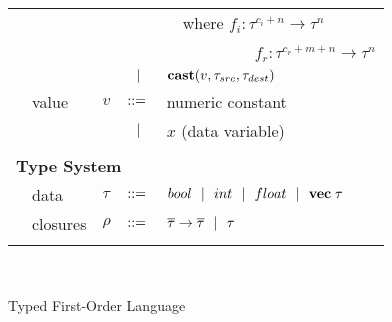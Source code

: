 \documentclass[preprint]{sigplanconf}
\begin{document}
\begin{figure}[h!]
\begin{tabular}{| m{0.01cm}m{1.3cm}m{0.1cm}m{0.2cm}p{5.0cm} |}
  &            &     &           & ~~\small{where $f_i : \tau^{c_i+n} \rightarrow \tau^n$} \\[1.5pt]
  &            &     &           & ~~~~~~~~~~~\small{$f_r : \tau^{c_r + m + n} \rightarrow \tau^n$} \\[2pt]
  &            &     & $\ \ | \ \ $    & $\mbox{\textbf{cast}} (v, \tau_{src}, \tau_{dest})$ \\[5pt]
  & value      & $v$ & $::=$ & numeric constant\\[2pt]
  &            &     & $\ \ | \ \ $    &  $x$  \quad \small{(data variable)} \\[5pt]
  & & & &\\
  \multicolumn{5}{|l|}{\textbf{Type System}} \\[4pt]
  & data     & $\tau$    & $::=$ & $bool \ \ | \ \  int \ \ | \ \  float \ \ | \ \  \mathbf{vec} \; \tau   $ \\[2pt]
  & closures        & $\rho$  & $::=$ & $\overline{\tau} \rightarrow \overline{\tau} \ \ | \ \   \tau$ \\[4pt]

  & & & &\\
  \hline
  \end{tabular}\\[4pt]
\caption{Typed First-Order Language}
\end{figure}
\end{document}
